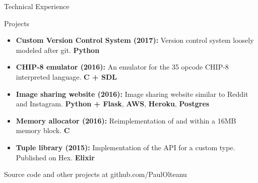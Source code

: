 \documentclass[calibri]{mcdowellcv}
\begin{document}
    \begin{cvsection}{Technical Experience}
        \begin{cvsubsection}{Projects}{}{}
            \begin{itemize}
                \item \textbf{Custom Version Control System (2017):} Version control system loosely modeled after git. \textbf{Python}
                \item \textbf{CHIP-8 emulator (2016):} An emulator for the 35 opcode CHIP-8 interpreted language. \textbf{C + SDL}
                \item \textbf{Image sharing website (2016):} Image sharing website similar to Reddit and Instagram. \textbf{Python + Flask}, \textbf{AWS}, \textbf{Heroku}, \textbf{Postgres}
                \item \textbf{Memory allocator (2016):} Reimplementation of  and  within a 16MB memory block. \textbf{C}
                \item \textbf{Tuple library (2015):} Implementation of the  API for a custom type. Published on Hex. \textbf{Elixir}
            \end{itemize}
            Source code and other projects at github.com/PaulOlteanu
        \end{cvsubsection}
    \end{cvsection}
\end{document}
